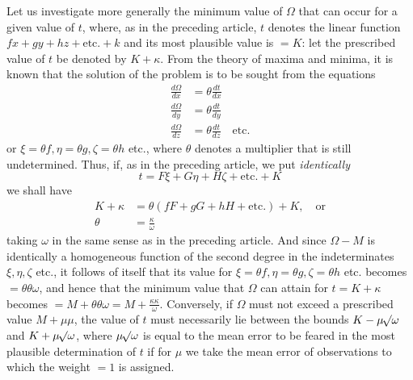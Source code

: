 Let us investigate more generally the minimum value of \(\Omega\) that can occur for a given value of \(t\), where, as in the preceding article, \(t\) denotes the linear function \(fx+gy+hz+\text{etc.}+k\) and its most plausible value is \(=K\): let the prescribed value of \(t\) be denoted by \(K+\kappa\). From the theory of maxima and minima, it is known that the solution of the problem is to be sought from the equations
\[
\begin{aligned}
\frac{d\Omega}{dx}&=\theta\frac{dt}{dx}\\[3pt]
\frac{d\Omega}{dy}&=\theta\frac{dt}{dy}\\[3pt]
\frac{d\Omega}{dz}&=\theta\frac{dt}{dz}\quad\text{etc.}
\end{aligned}
\]
or \(\xi=\theta f,\allowbreak\eta=\theta g,\allowbreak\zeta=\theta h\) etc., where \(\theta\) denotes a multiplier that is still undetermined. Thus, if, as in the preceding article, we put \textit{identically}
\[
t=F\xi+G\eta+H\zeta+\text{etc.}+K
\]
we shall have
\[
\begin{aligned}
K+\kappa&=\theta(fF+gG+hH+\text{etc.})+K,\quad\text{or}\\[3pt]
\theta&=\frac{\kappa}{\omega}
\end{aligned}
\]
taking \(\omega\) in the same sense as in the preceding article. And since \(\Omega-M\) is identically a homogeneous function of the second degree in the indeterminates \(\xi,\eta,\zeta\) etc., it follows of itself that its value for \(\xi=\theta f,\allowbreak\eta=\theta g,\allowbreak\zeta=\theta h\) etc. becomes \(=\theta\theta\omega\), and hence that the minimum value that \(\Omega\) can attain for \(t=K+\kappa\) becomes \(=M+\theta\theta\omega=M+\frac{\kappa\kappa}{\omega}\). Conversely, if \(\Omega\) must not exceed a prescribed value \(M+\mu\mu\), the value of \(t\) must necessarily lie between the bounds \(K-\mu\mathord{{}^{}\!\surd}\omega\) and \(K+\mu\mathord{{}^{}\!\surd}\omega\), where \(\mu\mathord{{}^{}\!\surd}\omega\) is equal to the mean error to be feared in the most plausible determination of \(t\) if for \(\mu\) we take the mean error of observations to which the weight \(=1\) is assigned.

\clearpage
